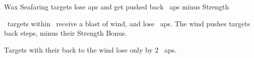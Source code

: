 
  {\mAir}%
  {Wax}%
  {\duplicated}%
  {Seafaring}%
  {targets lose  \glspl{ap} and get pushed back ~\glspl{ap} minus Strength}%
  {
    \spellArea\ targets within \spellRange\ receive a blast of wind, and lose ~\glspl{ap}.
    The wind pushes targets back  steps, minus their Strength Bonus.

  Targets with their back to the wind lose only
  \setcounter{track}{\value{spelllevel}}\divide\value{track} by 2%
  ~\glspl{ap}.
  }
